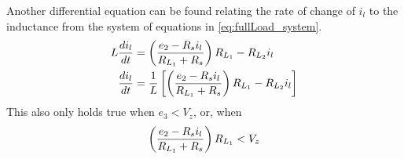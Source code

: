 \pagebreak
Another differential equation can be found relating the rate of change of $i_l$ to the inductance from the system of equations in \eqref{eq:fullLoad_system}.
\begin{equation}
	\begin{split}
		L\frac{di_l}{dt} &= \left(\frac{e_2 - R_s i_l}{R_{L_1} + R_s} \right)R_{L_1} - R_{L_2}i_l \\
		 \frac{di_l}{dt} &= \frac{1}{L} \left[
		 	\left(\frac{e_2 - R_s i_l}{R_{L_1} + R_s} \right)R_{L_1} - R_{L_2}i_l
		  \right]
	\end{split}
	\label{eq:fullLoad_DiffEq2}
\end{equation}
This also only holds true when $e_3 < V_z$, or, when
\begin{equation}
	\left(\frac{e_2 - R_s i_l}{R_{L_1} + R_s} \right)R_{L_1} < V_z
\end{equation}

